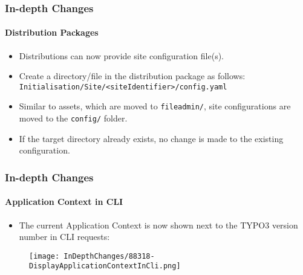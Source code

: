 
\begin{frame}[fragile]
	\frametitle{In-depth Changes}
	\framesubtitle{Distribution Packages}

	\lstset{basicstyle=\tiny\ttfamily}

	\begin{itemize}
		\item Distributions can now provide site configuration file(s).

		\item Create a directory/file in the distribution package as follows:\newline
			\texttt{Initialisation/Site/<siteIdentifier>/config.yaml}

		\item Similar to assets, which are moved to \texttt{fileadmin/},\newline
			site configurations are moved to the \texttt{config/} folder.

		\item If the target directory already exists, no change is made to the existing configuration.
	\end{itemize}

\end{frame}


\begin{frame}[fragile]
	\frametitle{In-depth Changes}
	\framesubtitle{Application Context in CLI}

	\begin{itemize}
		\item The current Application Context is now shown next to the
			TYPO3 version number in CLI requests:
	\end{itemize}

	\begin{figure}
		\texttt{[image: InDepthChanges/88318-DisplayApplicationContextInCli.png]}
	\end{figure}

\end{frame}


